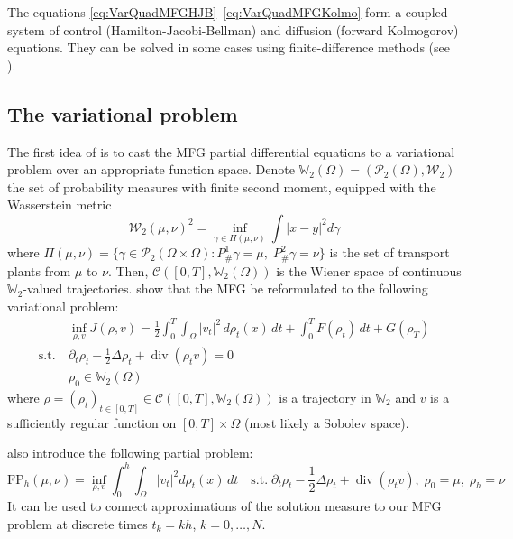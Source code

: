 \documentclass{article}
\newcommand{\WW}{\mathbb{W}}
\newcommand{\calC}{\mathcal{C}}
\newcommand{\calP}{\mathcal{P}}
\newcommand{\calW}{\mathcal{W}}
\newcommand{\suchthat}{\mathrm{s.t.}}
\DeclareMathOperator{\divg}{div}
\numberwithin{equation}{section}
\theoremstyle{definition}
\begin{document}
The equations \eqref{eq:VarQuadMFGHJB}--\eqref{eq:VarQuadMFGKolmo} form a coupled system of control (Hamilton-Jacobi-Bellman) and diffusion (forward Kolmogorov) equations. They can be solved in some cases using finite-difference methods (see \cite{achdou:hal-01456506}).

\subsection{The variational problem}

The first idea of \cite{benamou:hal-01295299} is to cast the MFG partial differential equations to a variational problem over an appropriate function space. Denote $\WW_2(\Omega) = (\calP_2(\Omega), \calW_2)$ the set of probability measures with finite second moment, equipped with the Wasserstein metric
\begin{equation}\label{eq:Wasserstein2Metric}
   	\calW_2(\mu,\nu)^2 = \inf_{\gamma\in\Pi(\mu,\nu)}
   	\int {|x-y|}^2 d\gamma
\end{equation}
where $\Pi(\mu,\nu) =\{ \gamma \in \calP_2(\Omega\times\Omega) : P^1_{\#}\gamma = \mu,\; P^2_{\#}\gamma = \nu \}$ is the set of transport plants from $\mu$ to $\nu$.
Then, $\mathcal{C}([0, T], \WW_2(\Omega))$ is the Wiener space of continuous $\WW_2$-valued trajectories.
\textcite{benamou:hal-01295299} show that the MFG be reformulated to the following variational problem:
\begin{subequations}\label{eq:EulerianProblem}
\begin{align}
   	&\inf_{\rho,v} J(\rho, v) =
   	\frac{1}{2}\int_0^T\int_\Omega |v_t|^2 \,d\rho_t(x)\,dt + \int_0^T F(\rho_t)\,dt + G(\rho_T)
   	\\
   	\suchthat\ &\partial_t \rho_t - \frac12\Delta \rho_t + \divg(\rho_t v) = 0 \\
   	&\rho_0 \in \WW_2(\Omega)	
\end{align}
\end{subequations}
where $\rho = (\rho_t)_{t\in[0,T]}\in \calC([0,T], \WW_2(\Omega))$ is a trajectory in $\WW_2$ and $v$ is a sufficiently regular function on $[0,T] \times \Omega$ (most likely a Sobolev space).

\textcite{benamou2018entropy} also introduce the following partial problem:
\begin{equation}\label{eq:FPhPartial}
	\mathrm{FP}_h(\mu,\nu) =
	\inf_{\rho, v} \int_0^h\int_\Omega |v_t|^2 d\rho_t(x)\,dt
	\quad \suchthat\;
	\partial_t\rho_t -\frac12\Delta\rho_t + \divg(\rho_tv),\;
	\rho_0 = \mu,\; \rho_h = \nu
\end{equation}
It can be used to connect approximations of the solution measure to our MFG problem at discrete times $t_k = kh$, $k=0,\ldots,N$.
\end{document}
